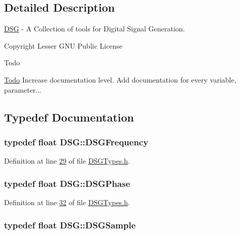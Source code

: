 \subsection{Detailed Description}
\hyperlink{namespace_d_s_g}{D\+S\+G} -\/ A Collection of tools for Digital Signal Generation. 

\begin{DoxyCopyright}{Copyright}
Lesser G\+N\+U Public License 
\end{DoxyCopyright}
\begin{DoxyRefDesc}{Todo}
\item[\hyperlink{todo__todo000006}{Todo}]Increase documentation level. Add documentation for every variable, parameter... \end{DoxyRefDesc}


\subsection{Typedef Documentation}
\hypertarget{namespace_d_s_g_a4315a061386fa1014fda09b15d3a6973}{
\subsubsection[{D\+S\+G\+Frequency}]{\setlength{\rightskip}{0pt plus 5cm}typedef float {\bf D\+S\+G\+::\+D\+S\+G\+Frequency}}}\label{namespace_d_s_g_a4315a061386fa1014fda09b15d3a6973}


Definition at line \hyperlink{_d_s_g_types_8h_source_l00029}{29} of file \hyperlink{_d_s_g_types_8h_source}{D\+S\+G\+Types.\+h}.

\hypertarget{namespace_d_s_g_a44431ce1eb0a7300efdd207bc879e52c}{
\subsubsection[{D\+S\+G\+Phase}]{\setlength{\rightskip}{0pt plus 5cm}typedef float {\bf D\+S\+G\+::\+D\+S\+G\+Phase}}}\label{namespace_d_s_g_a44431ce1eb0a7300efdd207bc879e52c}


Definition at line \hyperlink{_d_s_g_types_8h_source_l00032}{32} of file \hyperlink{_d_s_g_types_8h_source}{D\+S\+G\+Types.\+h}.

\hypertarget{namespace_d_s_g_ac39a94cd27ebcd9c1e7502d0c624894a}{
\subsubsection[{D\+S\+G\+Sample}]{\setlength{\rightskip}{0pt plus 5cm}typedef float {\bf D\+S\+G\+::\+D\+S\+G\+Sample}}}\label{namespace_d_s_g_ac39a94cd27ebcd9c1e7502d0c624894a}


